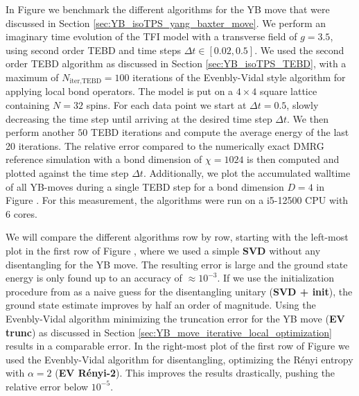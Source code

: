 In Figure  we benchmark the different algorithms for the YB move that were discussed in Section \ref{sec:YB_isoTPS_yang_baxter_move}. We perform an imaginary time evolution of the TFI model with a transverse field of $g = 3.5$, using second order TEBD and time steps $\Delta t \in \left[0.02, 0.5\right]$. We used the second order TEBD algorithm as discussed in Section \ref{sec:YB_isoTPS_TEBD}, with a maximum of $N_\text{iter,TEBD}=100$ iterations of the Evenbly-Vidal style algorithm for applying local bond operators. The model is put on a $4\times4$ square lattice containing $N = 32$ spins. For each data point we start at $\Delta t = 0.5$, slowly decreasing the time step until arriving at the desired time step $\Delta t$. We then perform another $50$ TEBD iterations and compute the average energy of the last 20 iterations. The relative error compared to the numerically exact DMRG reference simulation with a bond dimension of $\chi = 1024$ is then computed and plotted against the time step $\Delta t$. Additionally, we plot the accumulated walltime of all YB-moves during a single TEBD step for a bond dimension $D=4$ in Figure . For this measurement, the algorithms were run on a i5-12500 CPU with 6 cores.\par
%

%

%
We will compare the different algorithms row by row, starting with the left-most plot in the first row of Figure , where we used a simple \textbf{SVD} without any disentangling for the YB move. The resulting error is large and the ground state energy is only found up to an accuracy of $\approx10^{-3}$. If we use the initialization procedure from \cite{cite:isometric_tensor_network_states_in_two_dimensions, cite:efficient_simulation_of_dynamics_in_two_dimensional_quantum_spin_systems} as a naive guess for the disentangling unitary (\textbf{SVD + init}), the ground state estimate improves by half an order of magnitude. Using the Evenbly-Vidal algorithm minimizing the truncation error for the YB move (\textbf{EV trunc}) as discussed in Section \ref{sec:YB_move_iterative_local_optimization} results in a comparable error. In the right-most plot of the first row of Figure  we used the Evenbly-Vidal algorithm for disentangling, optimizing the Rényi entropy with $\alpha = 2$ (\textbf{EV Rényi-2}). This improves the results drastically, pushing the relative error below $10^{-5}$. \par
